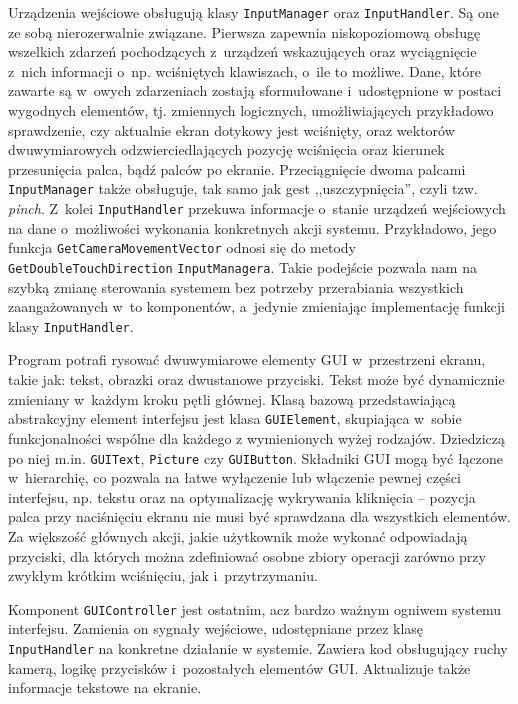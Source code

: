 		Urządzenia wejściowe obsługują klasy \texttt{InputManager} oraz \texttt{InputHandler}. Są one ze sobą nierozerwalnie związane. Pierwsza zapewnia niskopoziomową obsługę wszelkich zdarzeń pochodzących z~urządzeń wskazujących oraz wyciągnięcie z~nich informacji o~np. wciśniętych klawiszach, o~ile to możliwe. Dane, które zawarte są w~owych zdarzeniach zostają sformułowane i~udostępnione w postaci wygodnych elementów, tj. zmiennych logicznych, umożliwiających przykładowo sprawdzenie, czy aktualnie ekran dotykowy jest wciśnięty, oraz wektorów dwuwymiarowych odzwierciedlających pozycję wciśnięcia oraz kierunek przesunięcia palca, bądź palców po ekranie. Przeciągnięcie dwoma palcami \texttt{InputManager} także obsługuje, tak samo jak gest ,,uszczypnięcia'', czyli tzw. \emph{pinch}. Z~kolei \texttt{InputHandler} przekuwa informacje o~stanie urządzeń wejściowych na dane o~możliwości wykonania konkretnych akcji systemu. Przykładowo, jego funkcja \texttt{GetCameraMovementVector} odnosi się do metody \texttt{GetDoubleTouchDirection} \texttt{InputManagera}. Takie podejście pozwala nam na szybką zmianę sterowania systemem bez potrzeby przerabiania wszystkich zaangażowanych w~to komponentów, a~jedynie zmieniając implementację funkcji klasy \texttt{InputHandler}. 
		
		Program potrafi rysować dwuwymiarowe elementy GUI w~przestrzeni ekranu, takie jak: tekst, obrazki oraz dwustanowe przyciski.
		Tekst może być dynamicznie zmieniany w~każdym kroku pętli głównej. Klasą bazową przedstawiającą abstrakcyjny element interfejsu jest klasa \texttt{GUIElement}, skupiająca w~sobie funkcjonalności wspólne dla każdego z wymienionych wyżej rodzajów. Dziedziczą po niej m.in. \texttt{GUIText}, \texttt{Picture} czy \texttt{GUIButton}. Składniki GUI mogą być łączone w~hierarchię, co pozwala na łatwe wyłączenie lub włączenie pewnej części interfejsu, np. tekstu oraz na optymalizację wykrywania kliknięcia -- pozycja palca przy naciśnięciu ekranu nie musi być sprawdzana dla wszystkich elementów. Za większość głównych akcji, jakie użytkownik może wykonać odpowiadają przyciski, dla których można zdefiniować osobne zbiory operacji zarówno przy zwykłym krótkim wciśnięciu, jak i~przytrzymaniu.
		
		Komponent \texttt{GUIController} jest ostatnim, acz bardzo ważnym ogniwem systemu interfejsu. Zamienia on sygnały wejściowe, udostępniane przez klasę \texttt{InputHandler} na konkretne działanie w systemie. Zawiera kod obsługujący ruchy kamerą, logikę przycisków i~pozostałych elementów GUI. Aktualizuje także informacje tekstowe na ekranie. 
		
